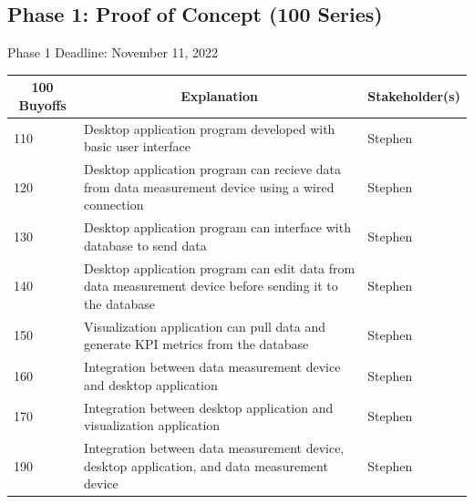 \documentclass[12pt]{article}
\begin{document}
\noindent
\subsection{Phase 1: Proof of Concept (100 Series)}
Phase 1 Deadline: November 11, 2022\\
\begin{table}[H]
  \centering
  \begin{tabular}{|p{2cm}|p{10cm}|p{2cm}|}
  \hline
  \multicolumn{1}{|c|}{\textbf{100 Buyoffs}} & \multicolumn{1}{c|}{\textbf{Explanation}} & \multicolumn{1}{|c|}{\textbf{Stakeholder(s)}}
  \\ \hline
  110
  & Desktop application program developed with basic user interface
  & Stephen
  \newline                                
  
  \\ \hline
  120                              
  & Desktop application program can recieve data from data measurement device using a wired connection
  & Stephen
  \newline                                

  \\ \hline
  130                          
  & Desktop application program can interface with database to send data
  & Stephen
  \newline                                

  \\ \hline
  140                                
  & Desktop application program can edit data from data measurement device before sending it to the database
  & Stephen 
  \newline                            

    \\ \hline
  150                                
  & Visualization application can pull data and generate KPI metrics from the database
  & Stephen 
  \newline 

  \\ \hline
  160                                
  & Integration between data measurement device and desktop application
  & Stephen 
  \newline 

  \\ \hline
  170                                
  & Integration between desktop application and visualization application
  & Stephen 
  \newline 

  \\ \hline
  190                                
  & Integration between data measurement device, desktop application, and data measurement device
  & Stephen 
  \newline 
  \\ \hline


  \end{tabular}
\end{table}
\end{document}
